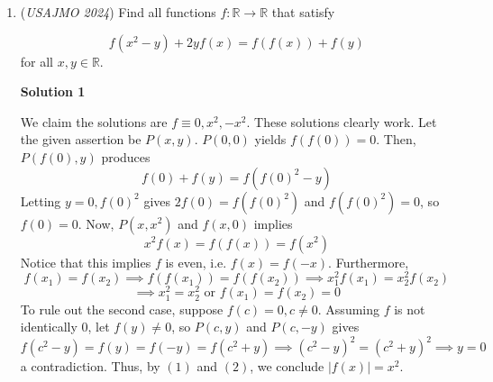 \begin{enumerate}
 Proof: The $m=0,n$ case is trivial: the grid never changes! For $m=1,n-1,$ we only have to prove the $n=1$ case because of symmetry: we can change red to blue and blue to red and it won't change the orderliness of the coloring as the overall arrangement of the different colors won't be changed. For the $m=1 case,$ when Rowan permutes the rows, all of the columns will still be different columns of the original grid (as each column must have one red square, the rows of the red squares will be different) and can be permuted back to the original arrangement by Colin. Thus, this lemma is true.

 
Finally, there is $1$ coloring for the $m=0$ case, and $n!$ ways to permute the red squares to see which column values are assigned to the rows in the $m=1$ case. There are similarly $n!$ colorings for the $m=n-1$ case, and $1$ coloring for the $m=0$ case. Thus, the answer is $\boxed{2n!+2}.$
$\text{*}$ Specifically, $\frac{C(n,k)}{C(n,k-1)}=\frac{n-k+1}{k-1}$ which is greater than $1$ for $2\le n \le \lfloor0.5n\rfloor.$

 \textbf{Another way to prove that $\binom{n}{m}>n$} Suppose we have $2\le{m}\le\lfloor{\frac{n}{2}}\rfloor$. Our goal is to show that

 
 \[\binom{n}{m}>n\]

 \[\frac{n}{m}\cdot\frac{n-1}{m-1}\cdot\frac{n-2}{m-2}\cdots\frac{n-m+1}{1}>n\]

 \[\frac{1}{m}\cdot\frac{n-1}{m-1}\cdot\frac{n-2}{m-2}\cdots\frac{n-m+1}{1}>1\]

 \[\frac{n-1}{m-1}\cdot\frac{n-2}{m-2}\cdots\frac{n-m+1}{m}>1\].

 Each of the above fractions is greater than one because $2\le{m}\le\lfloor{\frac{n}{2}}\rfloor$, so we are done.

 


	\item (\textit{USAJMO 2024}) Find all functions $f:\mathbb{R}\rightarrow\mathbb{R}$ that satisfy

 \[f(x^2-y)+2yf(x)=f(f(x))+f(y)\]
for all $x,y\in\mathbb{R}$.


 



\textbf{Solution 1}

We claim the solutions are $\boxed{f\equiv 0, x^2, -x^2}$. These solutions clearly work. Let the given assertion be $P(x, y)$. $P(0, 0)$ yields $f(f(0)) = 0$. Then, $P(f(0), y)$ produces 
 \[f(0)+f(y)=f(f(0)^2-y)\] Letting $y = 0, f(0)^2$ gives $2f(0)=f(f(0)^2)$ and $f(f(0)^2) = 0$, so $f(0)= 0$. Now, $P(x, x^2)$ and $f(x, 0)$ implies 
 \[x^2f(x)=f(f(x))=f(x^2) \tag{1}\]Notice that this implies $f$ is even, i.e. $f(x)=f(-x)$. Furthermore, 
 \[f(x_1)=f(x_2)\implies f(f(x_1))=f(f(x_2)) \implies x_1^2 f(x_1) = x_2^2 f(x_2)\]
 \[\implies x_1^2 = x_2^2 \text{ or } f(x_1)=f(x_2) = 0 \tag{2}\] To rule out the second case, suppose $f(c)=0, c\neq 0$. Assuming $f$ is not identically 0, let $f(y) \neq 0$, so $P(c, y)$ and $P(c, -y)$ gives
 \[f(c^2-y)=f(y)=f(-y) = f(c^2+y) \implies (c^2-y)^2 = (c^2+y)^2 \implies y = 0\] a contradiction. Thus, by $(1)$ and $(2)$, we conclude $|f(x)| = x^2$. 


\end{enumerate}
